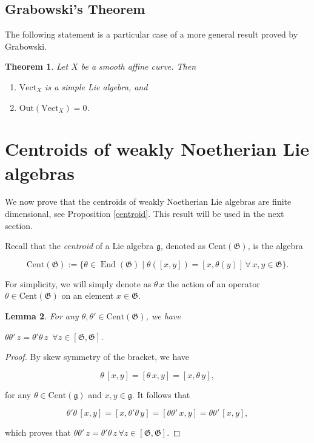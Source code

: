 \documentclass[11pt, letterpaper, reqno]{amsart}
\newtheorem{theorem}{Theorem}
\newtheorem{lemma}[theorem]{Lemma}
\theoremstyle{definition}
\newcommand{\End}{\operatorname{End}}
\newcommand{\fg}{\mathfrak{g}}
\newcommand{\fG}{\mathfrak{G}}
\newcommand{\Cent}{\mathrm{Cent}}
\newcommand{\Out}{\mathrm{Out}}
\newcommand{\Vect}{\mathrm{Vect}}
\begin{document}
\subsection{Grabowski's Theorem}

The following statement is a particular case of a 
more general result proved by Grabowski. 

\begin{theorem}\label{Grabowski}\cite{Grab1}\cite{Grab2} Let $X$ be a smooth affine curve.
Then
\begin{enumerate}
\item[(a)] $\Vect_X$ is a simple Lie algebra, and
\item[(b)] $\Out(\Vect_X)=0$. 
\end{enumerate}
\end{theorem}




\section{Centroids of weakly Noetherian Lie algebras}\label{Seccentroid}

We now prove that the centroids of weakly
Noetherian Lie algebras are finite dimensional, see Proposition \ref{centroid}.
This result will be used in the next section.



Recall that the  {\it centroid} of a Lie algebra $\fg$, denoted as $\Cent(\fG)$,  is the algebra

$$\Cent(\fG):=
\{\theta\in\End(\fG)\mid \theta([x,y])=[x,\theta(y)]\,\forall\,x,y\in\fG\}.$$


\noindent For simplicity, we will simply denote as $\theta\,x$ the action of an operator
$\theta\in \Cent(\fG)$ on an element $x\in\fG$. 

\begin{lemma}\label{com} For any 
$\theta,\theta'\in \Cent(\fG)$, we have

\centerline {$\theta\theta'\,z=
\theta'\theta\,z\,\, \,\forall z\in 
[\fG,\fG]$.}
\end{lemma}


\begin{proof} By skew symmetry of the bracket,
we have 

$$\theta\,[x,y]=[\theta\,x,y]=
[x,\theta\,y],$$

\noindent for any $\theta\in \Cent(\fg)$ and
$x,y\in\fg$. It follows that

$$\theta'\theta\,[x,y]=
[x,\theta'\theta\,y]=
[\theta\theta'\,x,y]=
\theta\theta'\,[x,y],$$

\noindent which proves that 
$\theta\theta'\,z=
\theta'\theta\,z \,\forall z\in 
[\fG,\fG]$.
\end{proof}
\end{document}
